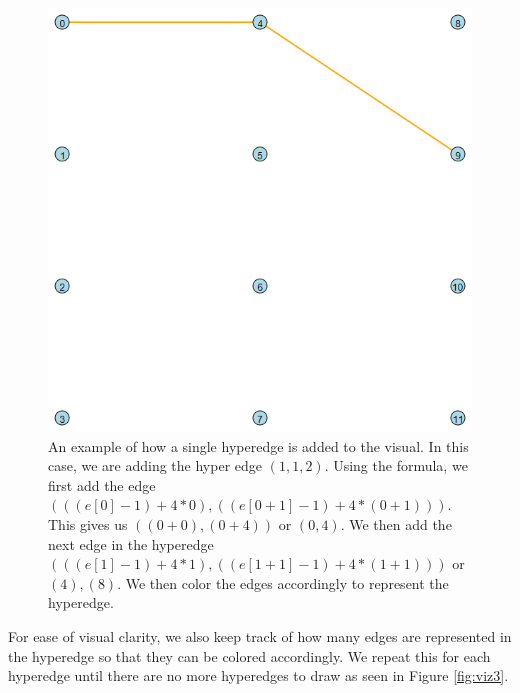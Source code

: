 \begin{figure}[t!]
    \centering
    \begin{minipage}{0.45\textwidth}
        \centering
        \includegraphics[width=\textwidth]{images/viz2.png}
        \caption{An example of how a single hyperedge is added to the visual. In this case, we are adding the hyper edge $(1, 1, 2)$. Using the formula, we first add the edge $(((e[0] - 1) + 4 * 0), ((e[0+1] - 1) + 4 * (0 + 1)))$. This gives us $((0 + 0), (0 + 4))$ or $(0,4)$. We then add the next edge in the hyperedge $(((e[1] - 1) + 4 * 1), ((e[1+1] - 1) + 4 * (1 + 1)))$ or $(4), (8)$. We then color the edges accordingly to represent the hyperedge.}
        \label{fig:viz2}
    \end{minipage}
    \hfill
\end{figure}

For ease of visual clarity, we also keep track of how many edges are represented in the 
hyperedge so that they can be colored accordingly. We repeat this for each hyperedge until 
there are no more hyperedges to draw as seen in Figure \ref{fig:viz3}.

